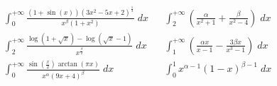 \begin{enumerate}
\begin{align*}
		       & \int_{0}^{+\infty } \frac{\left(1 + \sin \left(x\right)\right) \left(3x^2  - 5x + 2\right)^{\frac{1}{3}}}{x^{ \beta }\left(1 + x^2 \right)} \; dx &  & \int_{2}^{+ \infty } \left(\frac{\alpha}{x^2  + 1} + \frac{ \beta }{ x^2  -4}\right) \; dx \\
		       & \int_{2}^{ + \infty } \frac{\log \left(1 + \sqrt{x}\right) - \log \left(\sqrt{x} -1\right)}{x^{\frac{\beta}{2}}} \; dx                            &  & \int_{1}^{+ \infty } \left(\frac{\alpha x}{x -1} - \frac{3 \beta x}{x^3  -1}\right) \; dx  \\
		       & \int_{0}^{+ \infty } \frac{\sin \left(\frac{x}{2}\right) \arctan\left(\pi  x\right)}{x^{ \alpha } \left(9x + 4\right)^{\beta }} \; dx             &  & \int_{ 0 }^{1} x^{ \alpha  -1} \left(1 - x\right)^{ \beta  -1} \; dx
	      \end{align*}
\end{enumerate}
